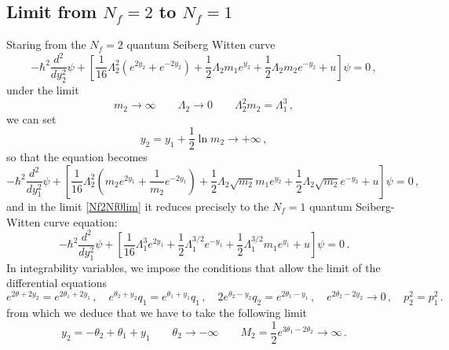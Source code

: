 \documentclass[11pt,a4paper]{elsarticle}
\def \th {\theta}
\newcommand{\be}{\begin{equation}}
\newcommand{\ee}{\end{equation}}
\def\th{\theta}
\numberwithin{figure}{section}
\numberwithin{table}{section}
\begin{document}
\subsection{Limit from $N_f=2$ to $N_f=1$}

Staring from the $N_f=2$ quantum Seiberg Witten curve
\be 
-\hbar^2  \frac{d^2}{d y_2^2} \psi + \left[\frac{1}{16} \Lambda_2^2 (e^{2y_2} +e^{-2y_2} ) + \frac{1}{2}\Lambda_2 m_1 e^{y_2} + \frac{1}{2}\Lambda_2 m_2 e^{-y_2} +u\right] \psi = 0\,,
\ee
under the limit
\be  \label{Nf2Nf0lim}
m_2 \to \infty \qquad \Lambda_2 \to 0 \qquad\Lambda_2^2 m_2 = \Lambda_1^3  \,,
\ee
we can set
\be 
y_2 = y_1+\frac{1}{2} \ln m_2 \to + \infty\,,
\ee
so that the equation becomes
 \be 
-\hbar^2  \frac{d^2}{d y_1^2} \psi + \left[\frac{1}{16} \Lambda_2^2\left ( m_2 e^{2y_1} +\frac{1}{m_2}e^{-2y_1} \right) + \frac{1}{2}\Lambda_2 \sqrt{m_2}m_1  e^{y_2} + \frac{1}{2}\Lambda_2 \sqrt{m_2} e^{-y_2} +u\right] \psi = 0\,,
\ee
and in the limit \eqref{Nf2Nf0lim} it reduces precisely to the $N_f=1$ quantum Seiberg-Witten curve equation:
\be 
-\hbar^2  \frac{d^2}{d y_1^2} \psi + \left[\frac{1}{16} \Lambda_1^3 e^{2y_1} +\frac{1}{2}\Lambda_1^{3/2}e^{-y_1}  +\frac{1}{2} \Lambda_1^{3/2} m_1 e^{y_1} +u\right] \psi = 0 \,.
\ee
In integrability variables, we impose the conditions that allow the limit of the differential equations
\be 
e^{2 \th+2y_2} = e^{2 \th_1+2 y_1} \,, \quad e^{\th_2+y_2} q_1= e^{\th_1+ y_1} q_1\,,\quad
2e^{\th_2-y_2} q_2 = e^{2 \th_1-y_1} \,,\quad e^{2 \th_2 - 2 y_2} \to 0\,,\quad p_2^2 = p_1^2\,.
\ee 
from which we deduce that we have to take the following limit
\be 
y_2 = - \th_2 + \th_1 + y_1 \qquad \th_2 \to - \infty \qquad M_2 = \frac{1}{2} e^{3 \th_1-2 \th_2} \to \infty\,.
\ee




%
\end{document}
